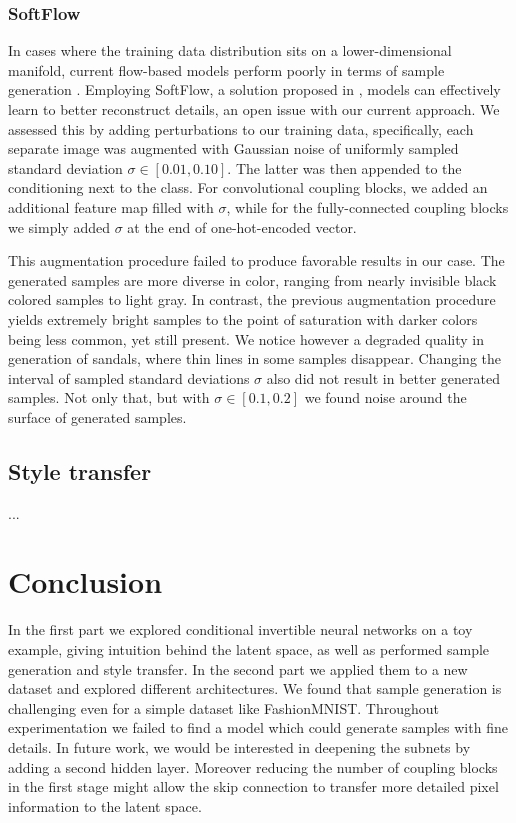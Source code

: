 \documentclass[final]{cvpr}
\begin{document}
\subsubsection{SoftFlow}\label{sec:experiment_softflow}
In cases where the training data distribution sits on a lower-dimensional manifold, current flow-based models perform poorly in terms of sample generation \cite{softflow}. Employing SoftFlow, a solution proposed in \cite{softflow}, models can effectively learn to better reconstruct details, an open issue with our current approach. We assessed this by adding perturbations to our training data, specifically, each separate image was augmented with Gaussian noise of uniformly sampled standard deviation $\sigma \in [0.01, 0.10]$. The latter was then appended to the conditioning next to the class. For convolutional coupling blocks, we added an additional feature map filled with $\sigma$, while for the fully-connected coupling blocks we simply added $\sigma$ at the end of one-hot-encoded vector.

This augmentation procedure failed to produce favorable results in our case. The generated samples are more diverse in color, ranging from nearly invisible black colored samples to light gray. In contrast, the previous augmentation procedure yields extremely bright samples to the point of saturation with darker colors being less common, yet still present. We notice however a degraded quality in generation of sandals, where thin lines in some samples disappear. Changing the interval of sampled standard deviations $\sigma$ also did not result in better generated samples. Not only that, but with $\sigma \in [0.1, 0.2]$ we found noise around the surface of generated samples.

\subsection{Style transfer}
...

\section{Conclusion}
In the first part we explored conditional invertible neural networks on a toy example, giving intuition behind the latent space, as well as performed sample generation and style transfer. In the second part we applied them to a new dataset and explored different architectures. We found that sample generation is challenging even for a simple dataset like FashionMNIST. Throughout experimentation we failed to find a model which could generate samples with fine details. In future work, we would be interested in deepening the subnets by adding a second hidden layer. Moreover reducing the number of coupling blocks in the first stage might allow the skip connection to transfer more detailed pixel information to the latent space.

{\small


}
\end{document}
